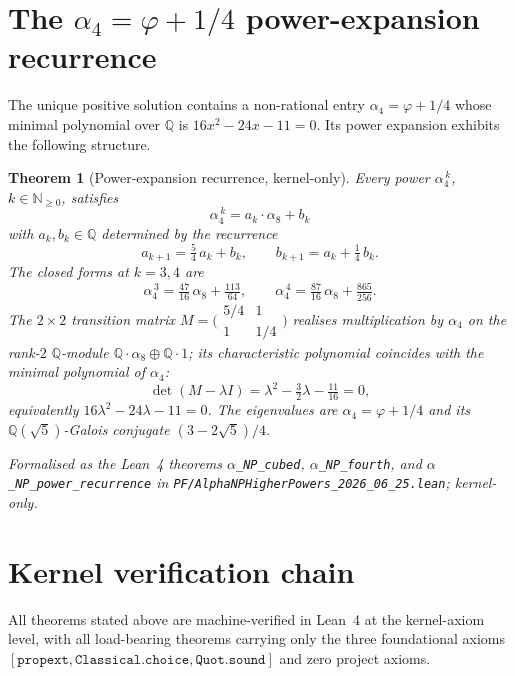 \documentclass[11pt,a4paper]{amsart}
\theoremstyle{plain}
\newtheorem{theorem}{Theorem}[section]
\theoremstyle{definition}
\begin{document}
\section{The $\alpha_4 = \varphi + 1/4$ power-expansion recurrence}

The unique positive solution contains a non-rational entry $\alpha_4 = \varphi + 1/4$ whose minimal polynomial over $\mathbb{Q}$ is $16x^2 - 24x - 11 = 0$. Its power expansion exhibits the following structure.

\begin{theorem}[Power-expansion recurrence, kernel-only]\label{thm:NPrec}
Every power $\alpha_4^{\,k}$, $k \in \mathbb{N}_{\geq 0}$, satisfies
\[
\alpha_4^{\,k} = a_k\cdot\alpha_8 + b_k
\]
with $a_k, b_k \in \mathbb{Q}$ determined by the recurrence
\[
a_{k+1} = \tfrac{5}{4}\,a_k + b_k,\qquad b_{k+1} = a_k + \tfrac{1}{4}\,b_k.
\]
The closed forms at $k = 3, 4$ are
\[
\alpha_4^{\,3} = \tfrac{47}{16}\,\alpha_8 + \tfrac{113}{64},\qquad \alpha_4^{\,4} = \tfrac{87}{16}\,\alpha_8 + \tfrac{865}{256}.
\]
The $2\times 2$ transition matrix $M = \bigl(\begin{smallmatrix}5/4 & 1\\ 1 & 1/4\end{smallmatrix}\bigr)$ realises multiplication by $\alpha_4$ on the rank-$2$ $\mathbb{Q}$-module $\mathbb{Q}\cdot\alpha_8\oplus\mathbb{Q}\cdot 1$; its characteristic polynomial coincides with the minimal polynomial of $\alpha_4$:
\[
\det(M - \lambda I) = \lambda^2 - \tfrac{3}{2}\lambda - \tfrac{11}{16} = 0,
\]
equivalently $16\lambda^2 - 24\lambda - 11 = 0$. The eigenvalues are $\alpha_4 = \varphi + 1/4$ and its $\mathbb{Q}(\sqrt{5})$-Galois conjugate $(3 - 2\sqrt{5})/4$.

Formalised as the Lean~4 theorems \texttt{$\alpha$\_NP\_cubed}, \texttt{$\alpha$\_NP\_fourth}, and \texttt{$\alpha$\_NP\_power\_recurrence} in \texttt{PF/AlphaNPHigherPowers\_2026\_06\_25.lean}; kernel-only.
\end{theorem}

\section{Kernel verification chain}

All theorems stated above are machine-verified in Lean~4 \cite{moura-ullrich2021} at the kernel-axiom level, with all load-bearing theorems carrying only the three foundational axioms $[\texttt{propext}, \texttt{Classical.choice}, \texttt{Quot.sound}]$ and zero project axioms.
\end{document}
